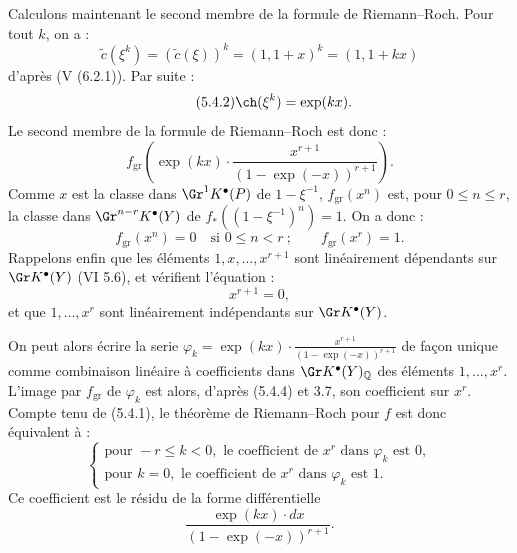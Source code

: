 Calculons maintenant le second membre de la formule de Riemann--Roch. Pour tout \(k\), on a :
\[
 \widetilde c(\xi^k)=(\widetilde c(\xi))^k=(1,1+x)^k=(1,1+kx)
\]
d'après (V (6.2.1)). Par suite :
\begin{equation}\tag{5.4.2}
 \ch(\xi^k)=\exp(kx).
\end{equation}
Le second membre de la formule de Riemann--Roch est donc :
\begin{equation}\tag{5.4.3}
 f_{\mathrm{gr}}\left(\exp(kx)\cdot
 \frac{x^{r+1}}{(1-\exp(-x))^{r+1}}\right).
\end{equation}
Comme \(x\) est la classe dans \(\Gr^1K^{\bullet}(P)\) de \(1-\xi^{-1}\), \(f_{\mathrm{gr}}(x^n)\) est, pour \(0\leq n\leq r\), la classe dans
\(\Gr^{n-r}K^{\bullet}(Y)\) de \(f_*((1-\xi^{-1})^n)=1\). On a donc :
\begin{equation}\tag{5.4.4}
 f_{\mathrm{gr}}(x^n)=0\quad\text{si }0\leq n<r~;\qquad
 f_{\mathrm{gr}}(x^r)=1.
\end{equation}
Rappelons enfin que les éléments \(1,x,\ldots,x^{r+1}\) sont linéairement dépendants sur \(\Gr K^{\bullet}(Y)\) (VI 5.6), et vérifient l'équation :
\begin{equation}\tag{5.4.5}
 x^{r+1}=0,
\end{equation}
et que \(1,\ldots,x^r\) sont linéairement indépendants sur \(\Gr K^{\bullet}(Y)\).

On peut alors écrire la serie \(\varphi_k=\exp(kx)\cdot\frac{x^{r+1}}{(1-\exp(-x))^{r+1}}\) de façon unique comme combinaison linéaire à coefficients dans
\(\Gr K^{\bullet}(Y)_{\mathbb Q}\) des éléments \(1,\ldots,x^r\). L'image par \(f_{\mathrm{gr}}\) de \(\varphi_k\) est alors, d'après (5.4.4) et 3.7, son coefficient sur \(x^r\). Compte tenu de (5.4.1), le théorème de Riemann--Roch pour \(f\) est donc équivalent à :
\[
\left\{
\begin{array}{ll}
\text{pour }-r\leq k<0,\text{ le coefficient de }x^r\text{ dans }\varphi_k\text{ est }0,\\
\text{pour }k=0,\text{ le coefficient de }x^r\text{ dans }\varphi_k\text{ est }1.
\end{array}
\right.
\tag{RR}
\]
Ce coefficient est le résidu de la forme différentielle
\[
 \frac{\exp(kx)\cdot dx}{(1-\exp(-x))^{r+1}}.
\]
